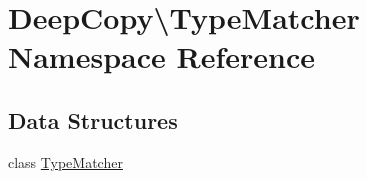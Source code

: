 \hypertarget{namespace_deep_copy_1_1_type_matcher}{}\section{Deep\+Copy\textbackslash{}Type\+Matcher Namespace Reference}
\label{namespace_deep_copy_1_1_type_matcher}
\subsection*{Data Structures}
\begin{DoxyCompactItemize}
\item 
class \mbox{\hyperlink{class_deep_copy_1_1_type_matcher_1_1_type_matcher}{Type\+Matcher}}
\end{DoxyCompactItemize}
